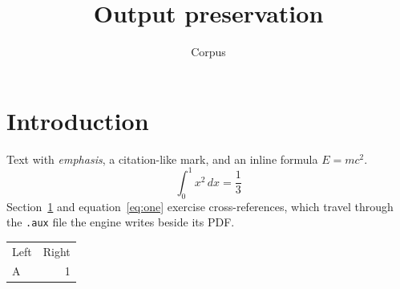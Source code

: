 \documentclass[11pt]{article}
\title{Output preservation}
\author{Corpus}
\begin{document}
\maketitle
\section{Introduction}\label{sec:intro}
Text with \emph{emphasis}, a citation-like mark, and an inline formula $E=mc^2$.
\begin{equation}\label{eq:one}
  \int_0^1 x^2 \, dx = \frac{1}{3}
\end{equation}
Section~\ref{sec:intro} and equation~\eqref{eq:one} exercise cross-references,
which travel through the \texttt{.aux} file the engine writes beside its PDF.
\begin{tabular}{lr}
  Left & Right \\
  A & 1 \\
\end{tabular}
\end{document}
